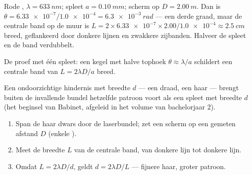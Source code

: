 \begin{example}\label{ex:g12:light-as-wave:slit}
Rode , $\lambda = \qty{633}{nm}$; spleet $a = \qty{0.10}{mm}$; scherm
op $D = \qty{2.00}{m}$. Dan is
$\theta = \num{6.33e-7} / \num{1.0e-4} = \qty{6.3e-3}{rad}$ --- een derde
graad, maar de centrale band op de muur is
$L = 2 \times \num{6.33e-7} \times 2.00 / \num{1.0e-4} \approx
\qty{2.5}{cm}$ breed, geflankeerd door donkere lijnen en zwakkere
zijbanden. Halveer de spleet en de band verdubbelt.
\end{example}

\begin{omfigure}

{\small De proef met één spleet: een kegel met halve tophoek
$\theta \approx \lambda/a$ schildert een centrale band van $L = 2\lambda
D/a$ breed.}
\end{omfigure}

\begin{proposition}\label{prop:g12:light-as-wave:hair}
Een  ondoorzichtige hindernis met breedte $d$ --- een draad, een haar
--- brengt buiten de invallende bundel hetzelfde patroon voort als een
spleet met breedte $d$ (het beginsel van Babinet, afgeleid in het volume
van bachelorjaar 2).
\end{proposition}
\admitted

\begin{method}\label{met:g12:light-as-wave:hairwidth}
\begin{enumerate}
  \item Span de haar dwars door de laserbundel; zet een scherm op een
        gemeten afstand $D$ (enkele ).
  \item Meet de breedte $L$ van de centrale band, van donkere lijn tot
        donkere lijn.
  \item Omdat $L = 2\lambda D/d$, geldt $d = 2\lambda D/L$ --- fijnere
        haar, groter patroon.
\end{enumerate}
\end{method}

